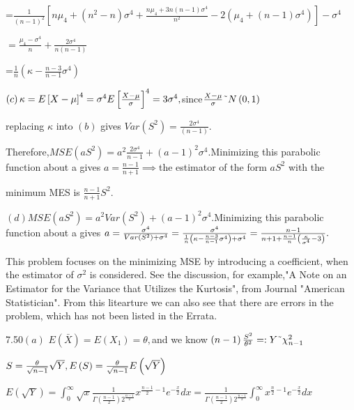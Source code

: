 \documentclass{article}
\begin{document}
=$\frac{1}{\left( n-1\right) ^{2}}\left[ n\mu _{4}+\left( n^{2}-n\right)
\sigma ^{4}+\frac{n\mu _{4}+3n\left( n-1\right) \sigma ^{4}}{n^{2}}-2\left(
\mu _{4}+\left( n-1\right) \sigma ^{4}\right) \right] -\sigma ^{4}$

$=\frac{\mu _{4}-\sigma ^{4}}{n}+\frac{2\sigma ^{4}}{n\left( n-1\right) }$

=$\frac{1}{n}\left( \kappa -\frac{n-3}{n-1}\sigma ^{4}\right) $

$\left( c\right) \kappa =E\left[ X-\mu \right] ^{4}=\sigma ^{4}E\left[ \frac{%
X-\mu }{\sigma }\right] ^{4}=3\sigma ^{4},$since$\frac{X-\mu }{\sigma }%
\symbol{126}N\left( 0,1\right) $

replacing $\kappa $ into $\left( b\right) $ gives $Var\left( S^{2}\right) =%
\frac{2\sigma ^{4}}{\left( n-1\right) }.$

Therefore,$MSE\left( aS^{2}\right) =a^{2}\frac{2\sigma ^{4}}{n-1}+\left(
a-1\right) ^{2}\sigma ^{4}.$Minimizing this parabolic function about a gives 
$a=\frac{n-1}{n+1}\implies $the estimator of the form $aS^{2}$ with the

minimum MES is $\frac{n-1}{n+1}S^{2}.$

$\left( d\right) MSE\left( aS^{2}\right) =a^{2}Var\left( S^{2}\right)
+\left( a-1\right) ^{2}\sigma ^{4}.$Minimizing this parabolic function about
a gives $a=\frac{\sigma ^{4}}{Var\left( S^{2}\right) +\sigma ^{4}}=\frac{%
\sigma ^{4}}{\frac{1}{n}\left( \kappa -\frac{n-3}{n-1}\sigma ^{4}\right)
+\sigma ^{4}}=\frac{n-1}{n+1+\frac{n-1}{n}\left( \frac{\kappa }{\sigma ^{4}}%
-3\right) }.$

This problem focuses on the minimizing MSE by introducing a coefficient,
when the estimator of $\sigma ^{2}$ is considered. See the discussion, for
example,"A Note on an Estimator for the Variance that Utilizes the
Kurtosis", from Journal "American Statistician". From this litearture we can
also see that there are errors in the problem, which has not been listed in
the Errata.

7.50$\left( a\right) $ $E\left( \bar{X}\right) =E\left( X_{1}\right) =\theta
,$and we know $\left( n-1\right) \frac{S^{2}}{\theta ^{2}}=:Y\symbol{126}%
\chi _{n-1}^{2}$

$S=\frac{\theta }{\sqrt{n-1}}\sqrt{Y},E\left( S\right) =\frac{\theta }{\sqrt{%
n-1}}E\left( \sqrt{Y}\right) $

$E\left( \sqrt{Y}\right) =\int_{0}^{\infty }\sqrt{x}\frac{1}{\Gamma \left( 
\frac{n-1}{2}\right) 2^{\frac{n-1}{2}}}x^{\frac{n-1}{2}-1}e^{-\frac{x}{2}}dx=%
\frac{1}{\Gamma \left( \frac{n-1}{2}\right) 2^{\frac{n-1}{2}}}%
\int_{0}^{\infty }x^{\frac{n}{2}-1}e^{-\frac{x}{2}}dx$
\end{document}
